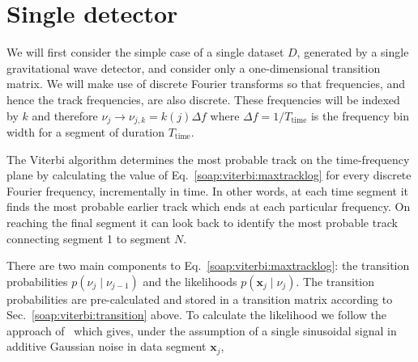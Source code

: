 \section{\label{soap:single}Single detector}
%
%

We will first consider the simple case of a single dataset $D$, generated by a single gravitational wave detector, and consider only a one-dimensional transition matrix. We will make use of discrete Fourier transforms so that frequencies, and hence the track frequencies, are also discrete. These frequencies will be indexed by $k$ and therefore $\nu_j \rightarrow \nu_{j,k}=k(j)\Delta f$ where $\Delta f=1/T_{\text{time}}$ is the frequency bin width for a segment of duration $T_{\text{time}}$.

 The Viterbi algorithm determines the most probable track on the time-frequency plane by calculating the value of Eq.~\ref{soap:viterbi:maxtracklog} for every discrete Fourier frequency, incrementally in time. In other words, at each time segment it finds the most probable earlier track which ends at each particular frequency. On reaching the final segment it can look back to identify the most probable track connecting segment 1 to segment $N$.

There are two main components to Eq.~\ref{soap:viterbi:maxtracklog}: the transition probabilities $p(\nu_j \mid \nu_{j-1})$ and the likelihoods $p({\bm x_j} \mid \nu_j)$. The transition probabilities are pre-calculated and stored in a transition matrix according to Sec.~\ref{soap:viterbi:transition} above. To calculate the likelihood we follow the approach of~\citep{bretthorst1988BayesianSpectruma} which gives, under the assumption of a single sinusoidal signal in additive Gaussian noise in data segment ${\bm x_j}$, 

